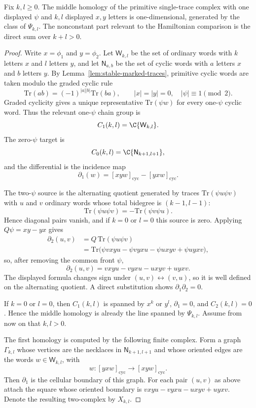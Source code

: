 \documentclass[11pt]{memoir}
\begin{document}
\begin{prop}\label{prop:one-psi-homology}
  Fix $k,l\geq0$. The middle homology of the primitive single-trace complex
  with one displayed $\psi$ and $k,l$ displayed $x,y$ letters is
  one-dimensional, generated by the class of $\Psi_{k,l}$. The nonconstant part
  relevant to the Hamiltonian comparison is the direct sum over $k+l>0$.
\end{prop}

\begin{proof}
  Write $x=\phi_1$ and $y=\phi_2$. Let $\mathsf W_{k,l}$ be the set of ordinary
  words with $k$ letters $x$ and $l$ letters $y$, and let
  $\mathsf N_{a,b}$ be the set of cyclic words with $a$ letters $x$ and $b$
	  letters $y$. By Lemma~\ref{lem:stable-marked-traces}, primitive cyclic words
	  are taken modulo the graded cyclic rule
	  $$\mathrm{Tr}(ab)=(-1)^{|a||b|}\mathrm{Tr}(ba),\qquad
	  |x|=|y|=0,\quad |\psi|\equiv1\pmod 2.$$
  Graded cyclicity gives a unique representative $\mathrm{Tr}(\psi w)$ for
  every one-$\psi$ cyclic word. Thus the relevant one-$\psi$ chain group is
  $$C_1(k,l)=\C\{\mathsf W_{k,l}\}.$$
  The zero-$\psi$ target is
  $$C_0(k,l)=\C\{\mathsf N_{k+1,l+1}\},$$
  and the differential is the incidence map
  $$\partial_1(w)=[xyw]_{\mathrm{cyc}}-[yxw]_{\mathrm{cyc}}.$$

  The two-$\psi$ source is the alternating quotient generated by traces
  $\mathrm{Tr}(\psi u\psi v)$ with $u$ and $v$ ordinary words whose total
  bidegree is $(k-1,l-1)$:
  $$\mathrm{Tr}(\psi u\psi v)=-\mathrm{Tr}(\psi v\psi u).$$
  Hence diagonal pairs vanish, and if $k=0$ or $l=0$ this source is zero.
  Applying $Q\psi=xy-yx$ gives
  \begin{align*}
  \partial_2(u,v)
    &=Q\,\mathrm{Tr}(\psi u\psi v)\\
    &=\mathrm{Tr}\bigl(\psi vxyu-\psi vyxu-\psi uxyv+\psi uyxv\bigr),
  \end{align*}
  so, after removing the common front $\psi$,
  $$\partial_2(u,v)=vxyu-vyxu-uxyv+uyxv.$$
  The displayed formula changes sign under $(u,v)\leftrightarrow(v,u)$, so it
  is well defined on the alternating quotient.
  A direct substitution shows $\partial_1\partial_2=0$.

  If $k=0$ or $l=0$, then $C_1(k,l)$ is spanned by $x^k$ or $y^l$,
  $\partial_1=0$, and $C_2(k,l)=0$. Hence the middle homology is already the
  line spanned by $\Psi_{k,l}$. Assume from now on that $k,l>0$.

  The first homology is computed by the following finite complex. Form a graph
  $\Gamma_{k,l}$ whose vertices are the necklaces in $\mathsf N_{k+1,l+1}$ and
  whose oriented edges are the words $w\in\mathsf W_{k,l}$, with
  $$w:[yxw]_{\mathrm{cyc}}\longrightarrow[xyw]_{\mathrm{cyc}}.$$
  Then $\partial_1$ is the cellular boundary of this graph. For each pair
  $(u,v)$ as above attach the square whose oriented boundary is
  $vxyu-vyxu-uxyv+uyxv$. Denote the resulting two-complex by $X_{k,l}$.


\end{proof}
\end{document}
